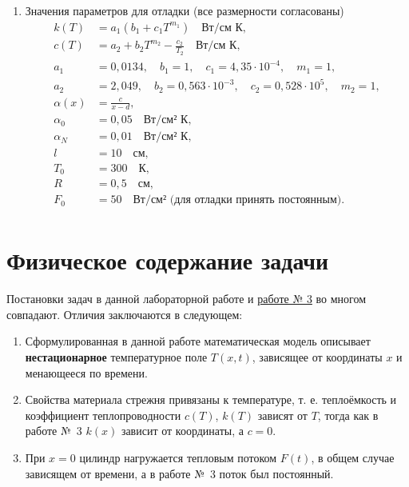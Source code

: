 \documentclass[a4paper,oneside,12pt]{extreport}
\begin{document}
\begin{enumerate}
	\item Значения параметров для отладки (все размерности согласованы)
	\begin{equation*}
		\begin{aligned}
			k(T) &= a_1(b_1 + c_1T^{m_1}) \quad\text{Вт/см К},\\
			c(T) &= a_2+b_2T^{m_2}-\frac{c_2}{T_2} \quad\text{Вт/см К},\\
			a_1 &= 0,0134,\quad b_1=1, \quad c_1=4,35\cdot10^{-4},\quad m_1=1,\\
			a_2 &= 2,049,\quad b_2=0,563\cdot10^{-3}, \quad c_2=0,528\cdot10^5,\quad m_2=1,\\
			\alpha(x)&=\frac{c}{x-d},\\
			\alpha_0 &= 0,05 \quad\text{Вт/см² К},\\
			\alpha_N &= 0,01 \quad\text{Вт/см² К},\\
			l        &= 10   \quad\text{см},\\
			T_0      &= 300  \quad\text{К},\\
			R        &= 0,5  \quad\text{см},\\
			F_0      &= 50   \quad\text{Вт/см² (для отладки принять постоянным)}.\\
		\end{aligned}
	\end{equation*}
\end{enumerate}

\section*{Физическое содержание задачи}

Постановки задач в данной лабораторной работе и \href{ftp://eufs.bmstu.ru/19426610-bd1a-11e6-93f1-005056960017/30-03-2020-%D0%97%D0%B0%D0%B4%D0%B0%D0%BD%D0%B8%D0%B5_%D0%BD%D0%B0_%D0%BB%D0%B0%D0%B1_%D1%80%D0%B0%D0%B1_%E2%84%963.doc}{работе № 3} во многом совпадают.
Отличия заключаются в следующем:
\begin{enumerate}
	\item Сформулированная в данной работе математическая модель описывает \textbf{нестационарное} температурное поле $T(x, t)$, зависящее от координаты $x$ и менающееся по времени.
	\item Свойства материала стрежня привязаны к температуре, т. е. теплоёмкость и коэффициент теплопроводности $c(T)$, $k(T)$ зависят от $T$, тогда как в работе №~3 $k(x)$ зависит от координаты, а $c=0$.
	\item При $x=0$ цилиндр нагружается тепловым потоком $F(t)$, в общем случае зависящем от времени, а в работе №~3 поток был постоянный.
\end{enumerate}
\end{document}
